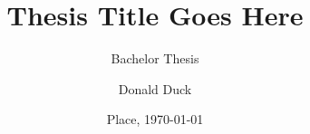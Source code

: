 
\usepackage{sebithesistitle}

\title{Thesis Title Goes Here}
\subtitle{Bachelor Thesis}
\author{Donald Duck}
\def\place{Place}
\date{\place, \today}

\def\documentname{Project	Plan for Bachelor Thesis Project}
\def\studentname{Donald Duck}
\def\snumber{1234567}
\def\course{Informatics - Software Engineering}
\def\period{February 2017 - July 2017}
\def\companyname{company abc}
\def\companyaddress{Some Address}
\def\companypostcodecity{12345, Somewhere}
\def\companycountry{Germany}
\def\companycoach{John Doe}
\def\companycoachmail{john.doe@company.com}
\def\universitytutor{Lecturer A}
\def\universitytutormail{lecturer.a@fontys.nl}
\def\examinator{Professional A}
\def\externalexpert{Professional B}
\def\hasnda{no}


\maketitle


\newpage


